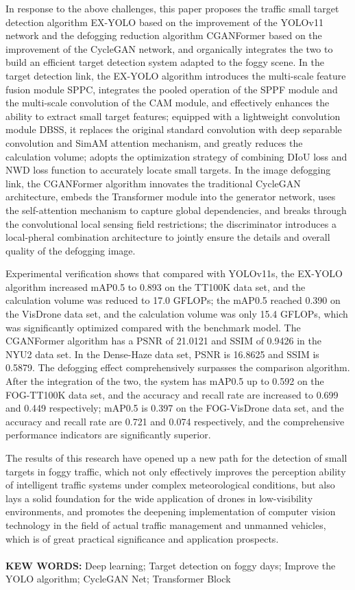 \begin{enabstract}
In response to the above challenges, this paper proposes the traffic small target detection algorithm EX-YOLO based on the improvement of the YOLOv11 network and the defogging reduction algorithm CGANFormer based on the improvement of the CycleGAN network, and organically integrates the two to build an efficient target detection system adapted to the foggy scene. In the target detection link, the EX-YOLO algorithm introduces the multi-scale feature fusion module SPPC, integrates the pooled operation of the SPPF module and the multi-scale convolution of the CAM module, and effectively enhances the ability to extract small target features; equipped with a lightweight convolution module DBSS, it replaces the original standard convolution with deep separable convolution and SimAM attention mechanism, and greatly reduces the calculation volume; adopts the optimization strategy of combining DIoU loss and NWD loss function to accurately locate small targets. In the image defogging link, the CGANFormer algorithm innovates the traditional CycleGAN architecture, embeds the Transformer module into the generator network, uses the self-attention mechanism to capture global dependencies, and breaks through the convolutional local sensing field restrictions; the discriminator introduces a local-pheral combination architecture to jointly ensure the details and overall quality of the defogging image.

Experimental verification shows that compared with YOLOv11s, the EX-YOLO algorithm increased mAP0.5 to 0.893 on the TT100K data set, and the calculation volume was reduced to 17.0 GFLOPs; the mAP0.5 reached 0.390 on the VisDrone data set, and the calculation volume was only 15.4 GFLOPs, which was significantly optimized compared with the benchmark model. The CGANFormer algorithm has a PSNR of 21.0121 and SSIM of 0.9426 in the NYU2 data set. In the Dense-Haze data set, PSNR is 16.8625 and SSIM is 0.5879. The defogging effect comprehensively surpasses the comparison algorithm. After the integration of the two, the system has mAP0.5 up to 0.592 on the FOG-TT100K data set, and the accuracy and recall rate are increased to 0.699 and 0.449 respectively; mAP0.5 is 0.397 on the FOG-VisDrone data set, and the accuracy and recall rate are 0.721 and 0.074 respectively, and the comprehensive performance indicators are significantly superior.

The results of this research have opened up a new path for the detection of small targets in foggy traffic, which not only effectively improves the perception ability of intelligent traffic systems under complex meteorological conditions, but also lays a solid foundation for the wide application of drones in low-visibility environments, and promotes the deepening implementation of computer vision technology in the field of actual traffic management and unmanned vehicles, which is of great practical significance and application prospects.
\\
\\
\textbf{KEW WORDS:} Deep learning;  Target detection on foggy days;  Improve the YOLO algorithm;  CycleGAN Net;  Transformer Block
\end{enabstract}
\pagebreak